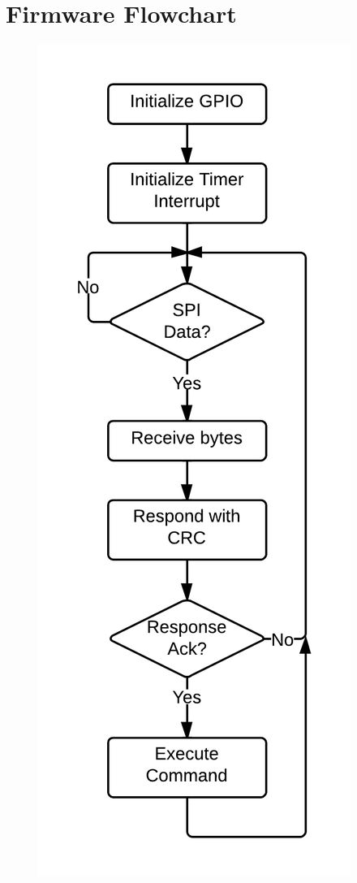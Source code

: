 \chapter{Firmware Flowchart}

\begin{figure}[!ht]
	\centering
	\begin{minipage}{.45\textwidth}
		\centering
		\includegraphics[width=.75\textwidth]{c2000-main.png}

\end{minipage}
\end{figure}
